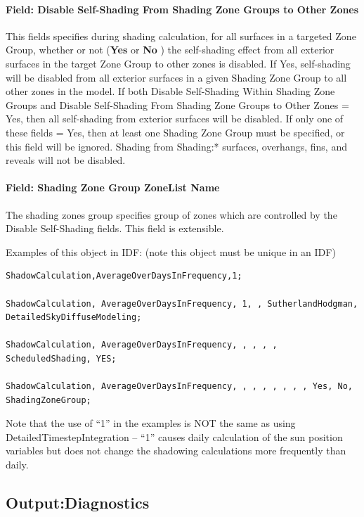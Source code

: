 \paragraph{Field: Disable Self-Shading From Shading Zone Groups to Other Zones}\label{field-self-disable-shading-between-zone-groups}
This fields specifies during shading calculation, for all surfaces in a targeted Zone Group, whether or not (\textbf{Yes} or \textbf{No} ) the self-shading effect from all exterior surfaces in the target Zone Group to other zones is disabled. If Yes, self-shading will be disabled from all exterior surfaces in a given Shading Zone Group to all other zones in the model. If both Disable Self-Shading Within Shading Zone Groups and Disable Self-Shading From Shading Zone Groups to Other Zones = Yes, then all self-shading from exterior surfaces will be disabled. If only one of these fields = Yes, then at least one Shading Zone Group must be specified, or this field will be ignored. Shading from Shading:* surfaces, overhangs, fins, and reveals will not be disabled.

\paragraph{Field: Shading Zone Group ZoneList Name}\label{field-shading-zone-group-zoneList-name}
The shading zones group specifies group of zones which are controlled by the Disable Self-Shading fields.
This field is extensible.

Examples of this object in IDF: (note this object must be unique in an IDF)

\begin{lstlisting}
ShadowCalculation,AverageOverDaysInFrequency,1;

ShadowCalculation, AverageOverDaysInFrequency, 1, , SutherlandHodgman, DetailedSkyDiffuseModeling;

ShadowCalculation, AverageOverDaysInFrequency, , , , , ScheduledShading, YES;

ShadowCalculation, AverageOverDaysInFrequency, , , , , , , , Yes, No, ShadingZoneGroup;
\end{lstlisting}

Note that the use of ``1'' in the examples is NOT the same as using DetailedTimestepIntegration -- ``1'' causes daily calculation of the sun position variables but does not change the shadowing calculations more frequently than daily.

\subsection{Output:Diagnostics}\label{outputdiagnostics}

